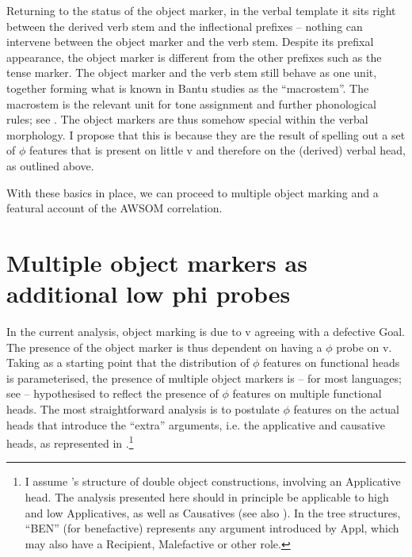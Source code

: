 \documentclass[output=paper
,modfonts
,nonflat]{langsci/langscibook}
\begin{document}
Returning to the status of the object marker, in the verbal template it sits right between the derived verb stem and the inflectional prefixes -- nothing can intervene between the object marker and the verb stem. Despite its prefixal appearance, the object marker is different from the other prefixes such as the tense marker. The object marker and the verb stem still behave as one unit, together forming what is known in Bantu studies as the ``macrostem''. The macrostem is the relevant unit for tone assignment and further phonological rules; see \citet{Hyman2003,Hyman_et_al2008,Marlo2015}. The object markers are thus somehow special within the verbal morphology. I propose that this is because they are the result of spelling out a set of $\phi$ features that is present on little v and therefore on the (derived) verbal head, as outlined above.

With these basics in place, we can proceed to multiple object marking and a featural account of the AWSOM correlation.

\section{ Multiple object markers as additional low phi probes} \label{sec-vdwal:5}
In the current analysis, object marking is due to v agreeing with a defective Goal. The presence of the object marker is thus dependent on having a $\phi$ probe on v. Taking as a starting point that the distribution of $\phi$ features on functional heads is parameterised, the presence of multiple object markers is -- for most languages; see  -- hypothesised to reflect the presence of $\phi$ features on multiple functional heads. The most straightforward analysis is to postulate $\phi$ features on the actual heads that introduce the ``extra'' arguments, i.e. the applicative and causative heads, as represented in .\footnote{I assume \citet{pylkkanen2008}'s structure of double object constructions, involving an Applicative head. The analysis presented here should in principle be applicable to high and low Applicatives, as well as Causatives (see also \citealt{Van_der_Wal2017a, Van_der_Wal2017b}). In the tree structures, ``BEN'' (for benefactive) represents any argument introduced by Appl, which may also have a Recipient, Malefactive or other role.}
\end{document}
